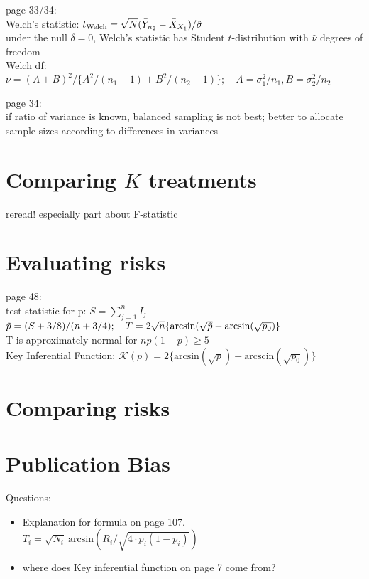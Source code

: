 page 33/34:\\
Welch's statistic: $t_{\text{Welch}}=\sqrt{N}(\Bar{Y}_{n_2}-\Bar{X}_{X_1})/\hat{\sigma}$\\
under the null $\delta =0$, Welch's statistic has Student $t$-distribution with $\hat{\nu}$ degrees of freedom\\
Welch df: $\nu = (A+B)^2/\{A^2/(n_1-1)+B^2/(n_2-1)\}; \quad A=\sigma_1^2/n_1, B=\sigma_2^2/n_2$

page 34:\\
if ratio of variance is known, balanced sampling is not best; better to allocate sample sizes according to differences in variances

\section{Comparing $K$ treatments}
reread! especially part about F-statistic

\section{Evaluating risks}
page 48:\\
test statistic for p: $S = \sum_{j=1}^n I_j$\\
$\Tilde{p}=(S+3/8)/(n+3/4);\quad T=2\sqrt{n}\{\text{arcsin}(\sqrt{\Tilde{p}}-\text{arcsin}(\sqrt{p_0})\}$\\
T is approximately normal for $np(1-p)\geq 5$\\
Key Inferential Function: $\mathcal{K}(p)=2\{\text{arcsin}(\sqrt{p})-\text{arcscin}(\sqrt{p_0})\}$

\section{Comparing risks}

\section{Publication Bias}
\label{intro_publicationbias}

Questions: 
\begin{itemize}
    \item Explanation for formula on page 107. \\ $T_i = \sqrt{N_i}\: \text{arcsin}(R_i/\sqrt{4\cdot p_i(1-p_i)})$
    \item where does Key inferential function on page 7 come from?
    \itme 
\end{itemize}

